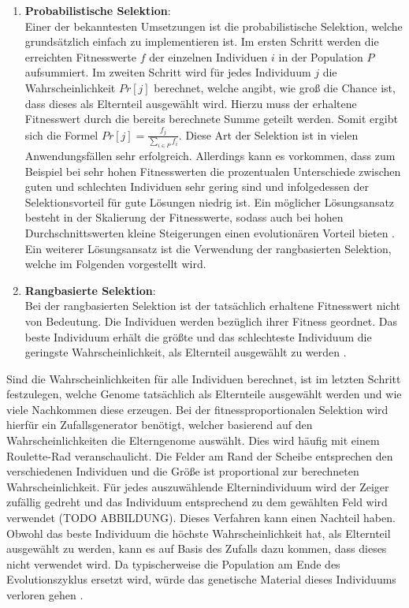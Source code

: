 \begin{enumerate}
	\item \textbf{Probabilistische Selektion}:\\
	Einer der bekanntesten Umsetzungen ist die probabilistische Selektion, welche grundsätzlich einfach zu implementieren ist. Im ersten Schritt werden die erreichten Fitnesswerte $f$ der einzelnen Individuen $i$ in der Population $P$ aufsummiert. Im zweiten Schritt wird für jedes Individuum $j$ die Wahrscheinlichkeit $Pr[j]$ berechnet, welche angibt, wie groß die Chance ist, dass dieses als Elternteil ausgewählt wird. Hierzu muss der erhaltene Fitnesswert durch die bereits berechnete Summe geteilt werden. Somit ergibt sich die Formel $Pr[j]=\frac{f_j}{\sum_{i \in P}f_i}$. Diese Art der Selektion ist in vielen Anwendungsfällen sehr erfolgreich. Allerdings kann es vorkommen, dass zum Beispiel bei sehr hohen Fitnesswerten die prozentualen Unterschiede zwischen guten und schlechten Individuen sehr gering sind und infolgedessen der Selektionsvorteil für gute Lösungen niedrig ist. Ein möglicher Lösungsansatz besteht in der Skalierung der Fitnesswerte, sodass auch bei hohen Durchschnittswerten kleine Steigerungen einen evolutionären Vorteil bieten \cite{weicker2015evolutionare}. Ein weiterer Lösungsansatz ist die Verwendung der rangbasierten Selektion, welche im Folgenden vorgestellt wird.
	
	\item  \textbf{Rangbasierte Selektion}:\\
	Bei der rangbasierten Selektion ist der tatsächlich erhaltene Fitnesswert nicht von Bedeutung. Die Individuen werden bezüglich ihrer Fitness geordnet. Das beste Individuum erhält die größte und das schlechteste Individuum die geringste Wahrscheinlichkeit, als Elternteil ausgewählt zu werden \cite{weicker2015evolutionare}. 
\end{enumerate}
Sind die Wahrscheinlichkeiten für alle Individuen berechnet, ist im letzten Schritt festzulegen, welche Genome tatsächlich als Elternteile ausgewählt werden und wie viele Nachkommen diese erzeugen. Bei der fitnessproportionalen Selektion wird hierfür ein Zufallsgenerator benötigt, welcher basierend auf den Wahrscheinlichkeiten die Elterngenome auswählt. Dies wird häufig mit einem Roulette-Rad veranschaulicht. Die Felder am Rand der Scheibe entsprechen den verschiedenen Individuen und die Größe ist proportional zur berechneten Wahrscheinlichkeit. Für jedes auszuwählende Elternindividuum wird der Zeiger zufällig gedreht und das Individuum  entsprechend zu dem gewählten Feld wird verwendet (TODO ABBILDUNG). Dieses Verfahren kann einen Nachteil haben. Obwohl das beste Individuum die höchste Wahrscheinlichkeit hat, als Elternteil ausgewählt zu werden, kann es auf Basis des Zufalls dazu kommen, dass dieses nicht verwendet wird. Da typischerweise die Population am Ende des Evolutionszyklus ersetzt wird, würde das genetische Material dieses Individuums verloren gehen \cite{weicker2015evolutionare}. 
